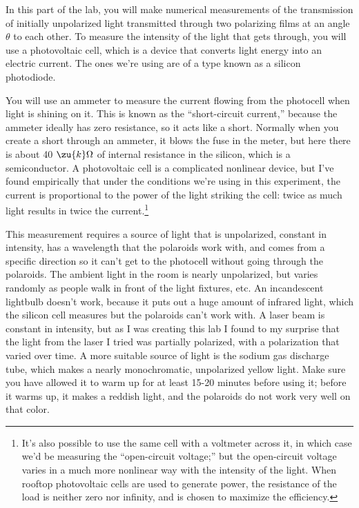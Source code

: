 
In this part of the lab, you will make numerical measurements
of the transmission of initially unpolarized light
transmitted through two polarizing films at an angle $\theta
$ to each other. To measure the intensity of the light that
gets through, you will use a photovoltaic cell, which is a device
that converts light energy into an electric current. The ones we're
using are of a type known as a silicon photodiode.

You will use an ammeter to measure the current flowing from the
photocell when light is shining on it. This is known as the ``short-circuit current,''
because the ammeter ideally has zero resistance, so it acts like a short. Normally when
you create a short through an ammeter, it blows the fuse in the meter, but here there
is about 40 $\zu{k}\Omega$ of internal resistance in the silicon, which is a semiconductor.
A photovoltaic cell is
a complicated nonlinear device, but I've found empirically
that under the conditions we're using in this experiment,
the current is proportional to the power of the light striking
the cell: twice as much light results in twice 
the current.\footnote{It's also possible to use the same cell with a voltmeter across it, in which case we'd be
measuring the ``open-circuit voltage;'' but the open-circuit voltage varies in a much
more nonlinear way with the intensity of the light. When rooftop photovoltaic cells are used
to generate power, the resistance of the load is neither zero nor infinity, and is chosen
to maximize the efficiency.}

This measurement requires a source of light that is
unpolarized, constant in intensity, has a wavelength that the polaroids work with, and comes from a
specific direction so it can't get to the photocell without
going through the polaroids. The ambient light in the room
is nearly unpolarized, but varies randomly as people walk in
front of the light fixtures, etc. An incandescent lightbulb doesn't work, because
it puts out a huge amount of infrared light, which the silicon cell measures but the
polaroids can't work with. A laser beam is constant
in intensity, but as I was creating this lab I found to my
surprise that the light from the laser I tried was partially polarized, with a polarization
that varied over time. A more suitable source of light is the
sodium gas discharge tube, which makes a nearly monochromatic,
unpolarized yellow light. Make sure you have allowed it to
warm up for at least 15-20 minutes before using it; before
it warms up, it makes a reddish light, and the polaroids do
not work very well on that color.

